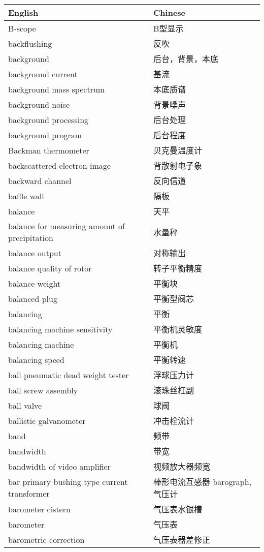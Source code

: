 \documentclass[
]{article}
\begin{document}
\begin{longtable}[]{@{}ll@{}}
\toprule()
English & Chinese \\
\midrule()
\endhead
B-scope & B型显示 \\
backflushing & 反吹 \\
background & 后台，背景，本底 \\
background current & 基流 \\
background mass spectrum & 本底质谱 \\
background noise & 背景噪声 \\
background processing & 后台处理 \\
background program & 后台程度 \\
Backman thermometer & 贝克曼温度计 \\
backscattered electron image & 背散射电子象 \\
backward channel & 反向信道 \\
baffle wall & 隔板 \\
balance & 天平 \\
balance for measuring amount of precipitation & 水量秤 \\
balance output & 对称输出 \\
balance quality of rotor & 转子平衡精度 \\
balance weight & 平衡块 \\
balanced plug & 平衡型阀芯 \\
balancing & 平衡 \\
balancing machine sensitivity & 平衡机灵敏度 \\
balancing machine & 平衡机 \\
balancing speed & 平衡转速 \\
ball pneumatic dead weight tester & 浮球压力计 \\
ball screw assembly & 滚珠丝杠副 \\
ball valve & 球阀 \\
ballistic galvanometer & 冲击栓流计 \\
band & 频带 \\
bandwidth & 带宽 \\
bandwidth of video amplifier & 视频放大器频宽 \\
bar primary bushing type current transformer & 棒形电流互感器
barograph,气压计 \\
barometer cistern & 气压表水银槽 \\
barometer & 气压表 \\
barometric correction & 气压表器差修正 \\

\end{longtable}
\end{document}
